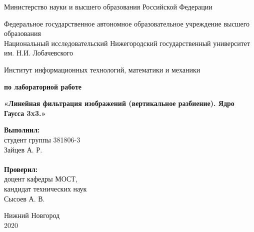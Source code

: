 \documentclass{report}
\begin{document}
\begin{titlepage}

\begin{center}
Министерство науки и высшего образования Российской Федерации
\end{center}

\begin{center}
Федеральное государственное автономное образовательное учреждение высшего образования \\
Национальный исследовательский Нижегородский государственный университет им. Н.И. Лобачевского
\end{center}

\begin{center}
Институт информационных технологий, математики и механики
\end{center}

\vspace{4em}

\begin{center}
\textbf{ по лабораторной работе} \\
\end{center}
\begin{center}
\textbf{\Large«Линейная фильтрация изображений (вертикальное разбиение). Ядро Гаусса 3x3.»} \\
\end{center}

\vspace{4em}

\newbox{\lbox}
\newlength{\maxl}
\setlength{\maxl}{\wd\lbox}
\hfill\parbox{7cm}{
\hspace*{5cm}\hspace*{-5cm}\textbf{Выполнил:} \\ студент группы 381806-3 \\ Зайцев А. Р.\\
\\
\hspace*{5cm}\hspace*{-5cm}\textbf{Проверил:}\\ доцент кафедры МОСТ, \\ кандидат технических наук \\ Сысоев А. В.\\
}
\vspace{\fill}

\begin{center} Нижний Новгород \\ 2020 \end{center}

\end{titlepage}
\end{document}
